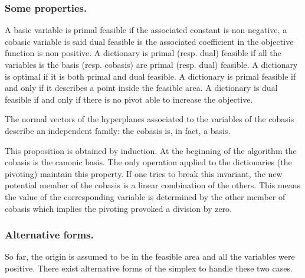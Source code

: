 



\subsubsection{Some properties.}
A basic variable is primal feasible if the associated constant is non negative, a cobasic variable is said dual feasible is the associated coefficient in the objective function is non positive. A dictionary is primal (resp. dual) feasible if all the variables is the basis (resp. cobasis) are primal (resp. dual) feasible. A dictionary is optimal if it is both primal and dual feasible. A dictionary is primal feasible if and only if it describes a point inside the feasible area. A dictionary is dual feasible if and only if there is no pivot able to increase the objective.

\begin{proposition}
The normal vectors of the hyperplanes associated to the variables of the cobasis describe an independent family: the cobasis is, in fact, a basis.
\end{proposition}
\vspace*{-0.4cm}
This proposition is obtained by induction. At the beginning of the algorithm the cobasis is the canonic basis. The only operation applied to the dictionaries (the pivoting) maintain this property. If one tries to break this invariant, the new potential member of the cobasis is a linear combination of the others. This means the value of the corresponding variable is determined by the other member of cobasis which implies the pivoting provoked a division by zero.


\subsubsection{Alternative forms.}
\label{section_altsimplex}
So far, the origin is assumed to be in the feasible area and all the variables were positive. There exist alternative forms of the simplex to handle these two cases.

